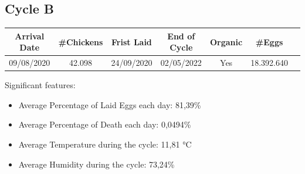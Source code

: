 \documentclass[11pt]{article}
\begin{document}
\subsection{Cycle B}
\begin{center}
    \begin{tabular}{| c | c | c | c | c | c | c |}
        \hline
        \textbf{Arrival Date} & \textbf{\#Chickens} & \textbf{Frist Laid} & \textbf{End of Cycle} & \textbf{Organic} & \textbf{\#Eggs}     \\ [0.5ex]
        \hline
        09/08/2020   & 42.098     & 24/09/2020 & 02/05/2022   & Yes     & 18.392.640 \\
        \hline
    \end{tabular}
\end{center}

Significant features:
\begin{itemize}
    \item Average Percentage of Laid Eggs each day: 81,39\%
    \item Average Percentage of Death each day: 0,0494\%
    \item Average Temperature during the cycle: 11,81 °C
    \item Average Humidity during the cycle: 73,24\%
\end{itemize}
\end{document}
